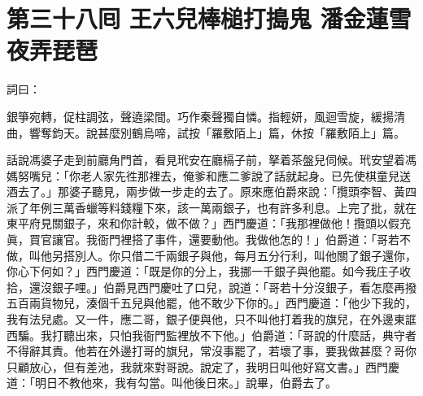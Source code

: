 
\chapter*{第三十八囘 王六兒棒槌打搗鬼 潘金蓮雪夜弄琵琶}


詞曰：

\begin{myquote}
銀箏宛轉，促柱調弦，聲遶梁間。巧作秦聲獨自憐。指輕妍，風迴雪旋，緩揚清曲，響奪鈞天。說甚麼別鶴烏啼，試按「羅敷陌上」篇，休按「羅敷陌上」篇。

\end{myquote}

話說馮婆子走到前廳角門首，看見玳安在廳槅子前，拏着茶盤兒伺候。玳安望着馮媽努嘴兒：「你老人家先徃那裡去，俺爹和應二爹說了話就起身。已先使棋童兒送酒去了。」那婆子聽見，兩步做一步走的去了。原來應伯爵來說：「攬頭李智、黃四派了年例三萬香蠟等料錢糧下來，該一萬兩銀子，也有許多利息。上完了批，就在東平府見關銀子，來和你計較，做不做？」西門慶道：「我那裡做他！攬頭以假充眞，買官讓官。我衙門裡搭了事件，還要動他。我做他怎的！」伯爵道：「哥若不做，叫他另搭別人。你只借二千兩銀子與他，每月五分行利，叫他關了銀子還你，你心下何如？」西門慶道：「既是你的分上，我挪一千銀子與他罷。如今我庄子收拾，還沒銀子哩。」伯爵見西門慶吐了口兒，說道：「哥若十分沒銀子，看怎麼再撥五百兩貨物兒，湊個千五兒與他罷，他不敢少下你的。」西門慶道：「他少下我的，我有法兒處。又一件，應二哥，銀子便與他，只不叫他打着我的旗兒，在外邊東誆西騙。我打聽出來，只怕我衙門監裡放不下他。」伯爵道：「哥說的什麼話，典守者不得辭其責。他若在外邊打哥的旗兒，常沒事罷了，若壞了事，要我做甚麼？哥你只顧放心，但有差池，我就來對哥說。說定了，我明日叫他好寫文書。」西門慶道：「明日不教他來，我有勾當。叫他後日來。」說畢，伯爵去了。

